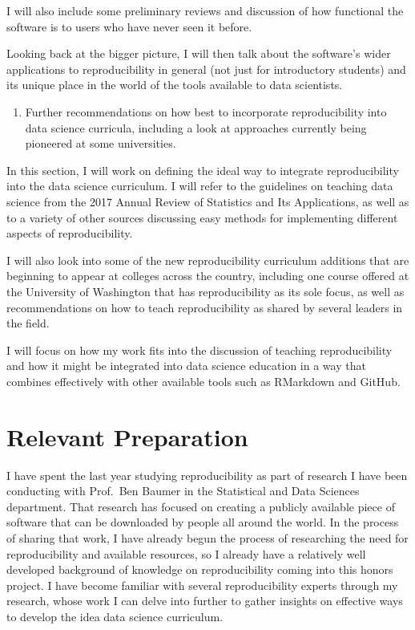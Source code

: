 \documentclass[12pt]{article}
\providecommand{\tightlist}{%
  \setlength{\itemsep}{0pt}\setlength{\parskip}{0pt}}
\begin{document}
I will also include some preliminary reviews and discussion of how
functional the software is to users who have never seen it before.

Looking back at the bigger picture, I will then talk about the
software's wider applications to reproducibility in general (not just
for introductory students) and its unique place in the world of the
tools available to data scientists.

\begin{enumerate}
\def\labelenumi{\arabic{enumi})}
\setcounter{enumi}{3}
\tightlist
\item
  Further recommendations on how best to incorporate reproducibility
  into data science curricula, including a look at approaches currently
  being pioneered at some universities.
\end{enumerate}

In this section, I will work on defining the ideal way to integrate
reproducibility into the data science curriculum. I will refer to the
guidelines on teaching data science from the 2017 Annual Review of
Statistics and Its Applications, as well as to a variety of other
sources discussing easy methods for implementing different aspects of
reproducibility.

I will also look into some of the new reproducibility curriculum
additions that are beginning to appear at colleges across the country,
including one course offered at the University of Washington that has
reproducibility as its sole focus, as well as recommendations on how to
teach reproducibility as shared by several leaders in the field.

I will focus on how my work fits into the discussion of teaching
reproducibility and how it might be integrated into data science
education in a way that combines effectively with other available tools
such as RMarkdown and GitHub.

\section{Relevant Preparation}\label{relevant-preparation}

I have spent the last year studying reproducibility as part of research
I have been conducting with Prof.~Ben Baumer in the Statistical and Data
Sciences department. That research has focused on creating a publicly
available piece of software that can be downloaded by people all around
the world. In the process of sharing that work, I have already begun the
process of researching the need for reproducibility and available
resources, so I already have a relatively well developed background of
knowledge on reproducibility coming into this honors project. I have
become familiar with several reproducibility experts through my
research, whose work I can delve into further to gather insights on
effective ways to develop the idea data science curriculum.
\end{document}
